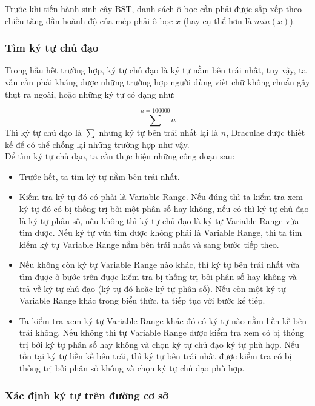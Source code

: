 \documentclass[a4paper,12pt]{article}
\begin{document}
	Trước khi tiến hành sinh cây BST, danh sách ô bọc cần phải được sắp xếp theo chiều tăng dần hoành độ của mép phải ô bọc $x$ (hay cụ thể hơn là $min(x)$). \\
	
	\subsubsection*{Tìm ký tự chủ đạo}
	
	Trong hầu hết trường hợp, ký tự chủ đạo là ký tự nằm bên trái nhất, tuy vậy, ta vẫn cần phải kháng được những trường hợp người dùng viết chữ không chuẩn gây thụt ra ngoài, hoặc những ký tự có dạng như:
	
	$$ \sum^{n = 100000} a $$
	Thì ký tự chủ đạo là $\sum$ nhưng ký tự bên trái nhất lại là $n$, Draculae\cite{zanibbi} được thiết kế để có thể chống lại những trường hợp như vậy.\\
	
	
	Để tìm ký tự chủ đạo, ta cần thực hiện những công đoạn sau:
	\begin{itemize}
		\item Trước hết, ta tìm ký tự nằm bên trái nhất.
		\item Kiếm tra ký tự đó có phải là Variable Range. Nếu đúng thì ta kiểm tra xem ký tự đó có bị thống trị bởi một phân số hay không, nếu có thì ký tự chủ đạo là ký tự phân số, nếu không thì ký tự chủ đạo là ký tự Variable Range vừa tìm được. Nếu ký tự vừa tìm được không phải là Variable Range, thì ta tìm kiếm ký tự Variable Range nằm bên trái nhất và sang bước tiếp theo.
		
		\item Nếu không còn ký tự Variable Range nào khác, thì ký tự bên trái nhất vừa tìm được ở bước trên được kiểm tra bị thống trị bởi phân số hay không và trả về ký tự chủ đạo (ký tự đó hoặc ký tự phân số). Nếu còn một ký tự Variable Range khác trong biểu thức, ta tiếp tục với bước kế tiếp.
		
		\item Ta kiểm tra xem ký tự Variable Range khác đó có ký tự nào nằm liền kề bên trái không. Nếu không thì tự Variable Range được kiểm tra xem có bị thống trị bởi ký tự phân số hay không và chọn ký tự chủ đạo ký tự phù hợp. Nếu tồn tại ký tự liền kề bên trái, thì ký tự bên trái nhất được kiểm tra có bị thống trị bởi phân số không và chọn ký tự chủ đạo phù hợp.
		
	\end{itemize}
	
	\subsubsection*{Xác định ký tự trên đường cơ sở}
	
\end{document}
